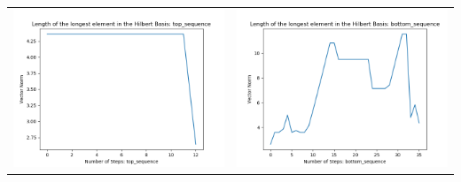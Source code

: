 \documentclass[10pt]{article}
\begin{document}
\begin{tabular}{c|c}
\begin{minipage}{.45\textwidth}
\includegraphics[width=\textwidth]{"DATA/4d/4 generators 2 bound A/top_sequence LENGTH"}
\end{minipage} &
\begin{minipage}{.45\textwidth}
\includegraphics[width=\textwidth]{"DATA/4d/4 generators 2 bound A bottomup/bottom_sequence LENGTH"}
\end{minipage}
\end{tabular}
\end{document}
